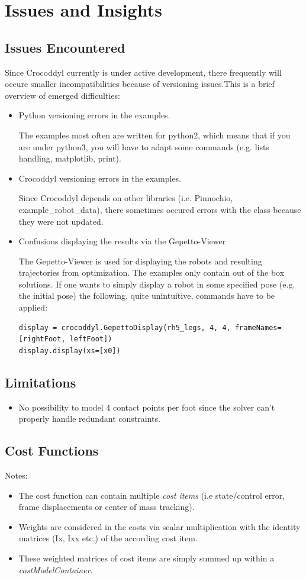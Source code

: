 \section{Issues and Insights}
\subsection{Issues Encountered}
Since Crocoddyl currently is under active development, there frequently will occure smaller incompatibilities because of versioning issues.This is a brief overview of emerged difficulties:
\begin{itemize}
\item Python versioning errors in the examples. 

The examples most often are written for python2, which means that if you are under python3, you will have to adapt some commands (e.g. lists handling, matplotlib, print).
\item Crocoddyl versioning errors in the examples. 

Since Crocoddyl depends on other libraries (i.e. Pinnochio, example\_robot\_data), there sometimes occured errors with the class because they were not updated. 
\item Confusions displaying the results via the Gepetto-Viewer

The Gepetto-Viewer is used for displaying the robots and resulting trajectories from optimization. The examples only contain out of the box solutions. If one wants to simply display a robot in some specified pose (e.g. the initial pose) the following, quite unintuitive, commands have to be applied:
\begin{verbatim}
display = crocoddyl.GepettoDisplay(rh5_legs, 4, 4, frameNames=[rightFoot, leftFoot])
display.display(xs=[x0])
\end{verbatim}
\end{itemize}

\subsection{Limitations}
\begin{itemize}
\item No possibility to model 4 contact points per foot since the solver can't properly handle redundant constraints. 
\end{itemize}

\subsection{Cost Functions}
Notes:
\begin{itemize}
\item The cost function can contain multiple \textit{cost items} (i.e state/control error, frame displacements or center of mass tracking).
\item Weights are considered in the costs via scalar multiplication with the identity matrices (Ix, Ixx etc.) of the according cost item. 
\item These weighted matrices of cost items are simply summed up within a \textit{costModelContainer}.
\end{itemize}

